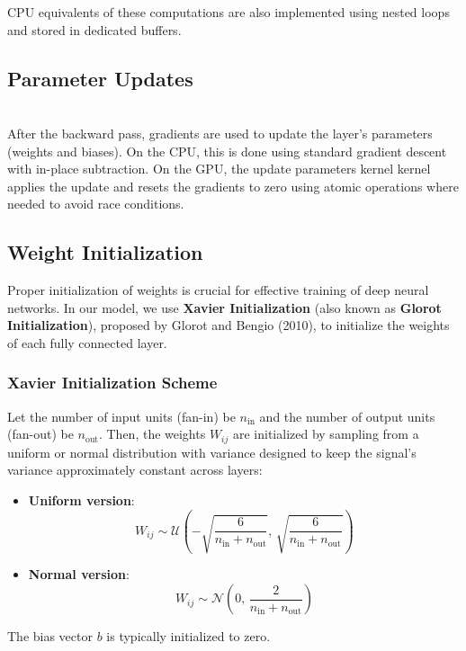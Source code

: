 CPU equivalents of these computations are also implemented using nested loops and stored in dedicated buffers.

\subsection{Parameter Updates}\\
After the backward pass, gradients are used to update the layer's parameters (weights and biases). On the CPU, this is done using standard gradient descent with in-place subtraction. On the GPU, the update parameters kernel kernel applies the update and resets the gradients to zero using atomic operations where needed to avoid race conditions.

\subsection{Weight Initialization}

Proper initialization of weights is crucial for effective training of deep neural networks. In our model, we use \textbf{Xavier Initialization} (also known as \textbf{Glorot Initialization}), proposed by Glorot and Bengio (2010), to initialize the weights of each fully connected layer.

\subsubsection*{Xavier Initialization Scheme}

Let the number of input units (fan-in) be \( n_{\text{in}} \) and the number of output units (fan-out) be \( n_{\text{out}} \). Then, the weights \( W_{ij} \) are initialized by sampling from a uniform or normal distribution with variance designed to keep the signal's variance approximately constant across layers:

\begin{itemize}
    \item \textbf{Uniform version}:
    \[
        W_{ij} \sim \mathcal{U} \left( -\sqrt{\frac{6}{n_{\text{in}} + n_{\text{out}}}}, \, \sqrt{\frac{6}{n_{\text{in}} + n_{\text{out}}}} \right)
    \]
    \item \textbf{Normal version}:
    \[
        W_{ij} \sim \mathcal{N} \left( 0, \, \frac{2}{n_{\text{in}} + n_{\text{out}}} \right)
    \]
\end{itemize}

The bias vector \( b \) is typically initialized to zero.\\

